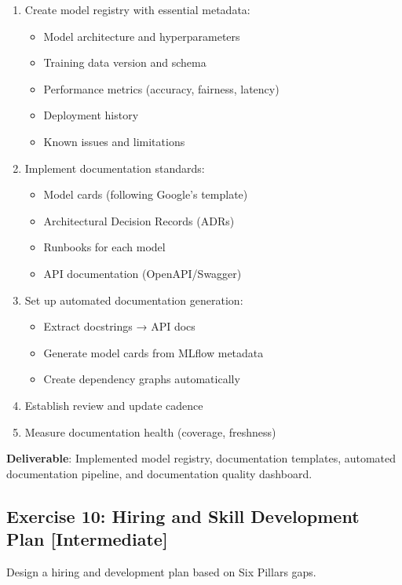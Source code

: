 \begin{enumerate}
    \item Create model registry with essential metadata:
        \begin{itemize}
            \item Model architecture and hyperparameters
            \item Training data version and schema
            \item Performance metrics (accuracy, fairness, latency)
            \item Deployment history
            \item Known issues and limitations
        \end{itemize}
    \item Implement documentation standards:
        \begin{itemize}
            \item Model cards (following Google's template)
            \item Architectural Decision Records (ADRs)
            \item Runbooks for each model
            \item API documentation (OpenAPI/Swagger)
        \end{itemize}
    \item Set up automated documentation generation:
        \begin{itemize}
            \item Extract docstrings → API docs
            \item Generate model cards from MLflow metadata
            \item Create dependency graphs automatically
        \end{itemize}
    \item Establish review and update cadence
    \item Measure documentation health (coverage, freshness)
\end{enumerate}

\textbf{Deliverable}: Implemented model registry, documentation templates, automated documentation pipeline, and documentation quality dashboard.

\subsection{Exercise 10: Hiring and Skill Development Plan [Intermediate]}

Design a hiring and development plan based on Six Pillars gaps.

